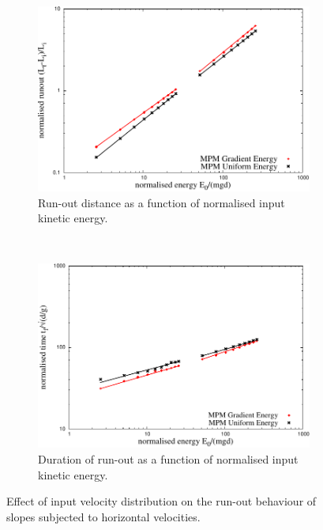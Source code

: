 \begin{figure}[tbph]
\centering
\begin{subfigure}[b]{0.9\textwidth}
\centering
\includegraphics[width=\textwidth]{Runout_Eo_GU}
\caption{Run-out distance as a function of normalised input kinetic energy.}
\label{fig:Runout_Eo_GU}
\end{subfigure}
\\
\begin{subfigure}[b]{0.9\textwidth}
\centering
\includegraphics[width=\textwidth]{time_Eo_GU}
\caption{Duration of run-out as a function of normalised input kinetic energy.}
\label{fig:time_Eo_GU}
\end{subfigure}
\caption{Effect of input velocity distribution on the run-out behaviour of 
slopes subjected to horizontal velocities.}
\label{fig:GU}
\end{figure}

